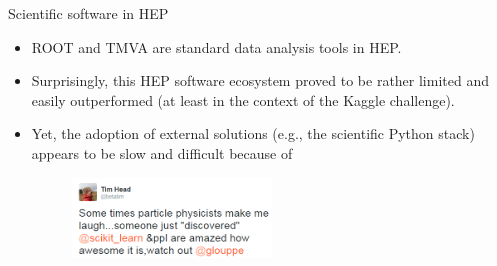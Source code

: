 \documentclass{beamer}
\begin{document}
\begin{frame}{Scientific software in HEP}

\begin{itemize}
    \item ROOT and TMVA are standard data analysis tools in HEP.

    \vspace{0.25cm}

    \item Surprisingly, this {\color{red} HEP software ecosystem proved to be rather limited
          and easily outperformed} (at least in the context of the Kaggle challenge).

    \vspace{0.25cm}

    \item Yet, the adoption of external solutions (e.g., the scientific Python stack) appears to be slow and difficult because of

    \begin{figure}
    \includegraphics[width=0.5\textwidth]{./figures/tim.png}
    \end{figure}

\end{itemize}

\end{frame}

\end{document}
